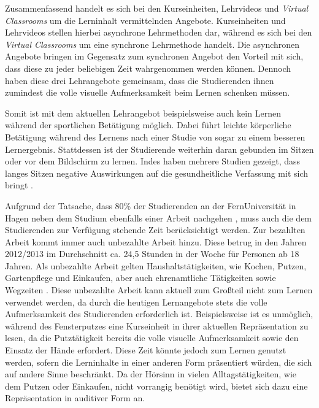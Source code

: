 Zusammenfassend handelt es sich bei den Kurseinheiten, Lehrvideos und \textit{Virtual Classrooms} um  die Lerninhalt vermittelnden Angebote. Kurseinheiten und Lehrvideos stellen hierbei asynchrone Lehrmethoden dar, während es sich bei den \textit{Virtual Classrooms} um eine synchrone Lehrmethode handelt. Die asynchronen Angebote bringen im Gegensatz zum synchronen Angebot den Vorteil mit sich, dass diese zu jeder beliebigen Zeit wahrgenommen werden können. Dennoch haben diese drei Lehrangebote gemeinsam, dass die Studierenden ihnen zumindest die volle visuelle Aufmerksamkeit beim Lernen schenken müssen. 

Somit ist mit dem aktuellen Lehrangebot beispielsweise auch kein Lernen während der sportlichen Betätigung möglich. Dabei führt leichte körperliche Betätigung während des Lernens nach einer Studie von \cite{schmidt2013physical} sogar zu einem besseren Lernergebnis. Stattdessen ist der Studierende weiterhin daran gebunden im Sitzen oder vor dem Bildschirm zu lernen. Indes haben mehrere Studien gezeigt, dass langes Sitzen negative Auswirkungen auf die gesundheitliche Verfassung mit sich bringt \citep{tremblay2011systematic}.

Aufgrund der Tatsache, dass 80\% der Studierenden an der FernUniversität in Hagen neben dem Studium ebenfalls einer Arbeit nachgehen \citep{fernuniversitaet2018stat}, muss auch die dem Studierenden zur Verfügung stehende Zeit berücksichtigt werden. Zur bezahlten Arbeit kommt immer auch unbezahlte Arbeit hinzu. Diese betrug in den Jahren 2012/2013 im Durchschnitt ca. 24,5 Stunden in der Woche für Personen ab 18 Jahren. Als unbezahlte Arbeit gelten Haushaltstätigkeiten, wie Kochen, Putzen, Gartenpflege und Einkaufen, aber auch ehrenamtliche Tätigkeiten sowie Wegzeiten \citep{destatis2015zeit}. Diese unbezahlte Arbeit kann aktuell zum Großteil nicht zum Lernen verwendet werden, da durch die heutigen Lernangebote stets die volle Aufmerksamkeit des Studierenden erforderlich ist. Beispielsweise ist es unmöglich, während des Fensterputzes eine Kurseinheit in ihrer aktuellen Repräsentation zu lesen, da die Putztätigkeit bereits die volle visuelle Aufmerksamkeit sowie den Einsatz der Hände erfordert. Diese Zeit könnte jedoch zum Lernen genutzt werden, sofern die Lerninhalte in einer anderen Form präsentiert würden, die sich auf andere Sinne beschränkt. Da der Hörsinn in vielen Alltagstätigkeiten, wie dem Putzen oder Einkaufen, nicht vorrangig benötigt wird, bietet sich dazu eine Repräsentation in auditiver Form an.

